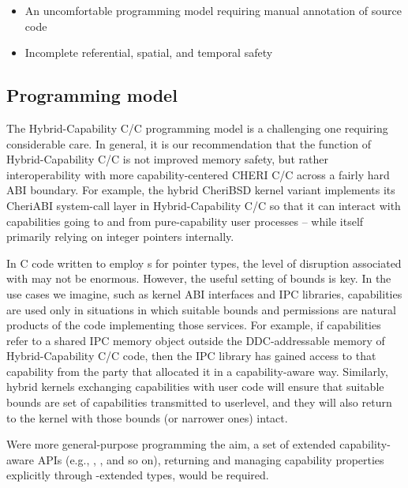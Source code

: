 \documentclass[12pt,twoside,openright,a4paper]{article}
\newcommand{\ccode}[1]{{\small\ttfamily{#1}}}
\newcommand{\uucap}{{\ccode{\_\_capability}}\xspace}
\newcommand{\note}[2]{{\color{blue}[ Note: #1 - #2]}}
\renewcommand{\note}[2]{\relax\ifhmode\unskip\fi}
\newcommand{\jhbnote}[1]{\note{#1}{John B.}}
\newcommand*{\cpp}{\texorpdfstring{C\textsmaller[2]{\protect\nolinebreak[4]\hspace{-.05em}\raisebox{.45ex}{\textbf{++}}}}{C++}}
\newcommand*{\COrCpp}{C/\cpp{}}
\newcommand*{\purecapCOrCpp}{CHERI \COrCpp{}}
\newcommand*{\hybridCOrCpp}{Hybrid-Capability \COrCpp{}}
\begin{document}
\begin{itemize}
\item An uncomfortable programming model requiring manual annotation of
  source code
\item Incomplete referential, spatial, and temporal safety
\end{itemize}

\subsection{Programming model}

The \hybridCOrCpp{} programming model is a challenging one requiring
considerable care.
In general, it is our recommendation that the function of \hybridCOrCpp{} is
not improved memory safety, but rather interoperability with more
capability-centered \purecapCOrCpp{} across a fairly hard ABI boundary.
For example, the hybrid CheriBSD kernel variant implements its CheriABI
system-call layer in \hybridCOrCpp{} so that it can interact with capabilities
going to and from pure-capability user processes -- while itself primarily
relying on integer pointers internally.

In C code written to employ \ccode{typedef}s for pointer types, the level
of disruption associated with \uucap{} may not be enormous.
However, the useful setting of bounds is key.
In the use cases we imagine, such as kernel ABI interfaces and IPC libraries,
capabilities are used only in situations in which suitable bounds and
permissions are natural products of the code implementing those services.
For example, if capabilities refer to a shared IPC memory object outside the
DDC-addressable memory of \hybridCOrCpp{} code, then the IPC library has
gained access to that capability from the party that allocated it in a
capability-aware way.
Similarly, hybrid kernels exchanging capabilities with user code will ensure
that suitable bounds are set of capabilities transmitted to userlevel, and
they will also return to the kernel with those bounds (or narrower ones)
intact.

Were more general-purpose programming the aim, a set of extended
capability-aware APIs (e.g., \ccode{malloc\_c()}, \ccode{mmap\_c()}, and so
on), returning and managing capability properties explicitly through
\uucap{}-extended types, would be required.

\jhbnote{Somewhere we should perhaps point out that existing hybrid
  ABIs don't try to ``respect'' DDC.  In particular, as far as I am
  aware, \ccode{mmap()} will happily return integer pointers that are
  out of bounds of DDC if userland has constrained its DDC.  I think
  the expectation is that if hybrid userland wants to modify DDC, it
  has to wrap system calls, etc.}
\end{document}
